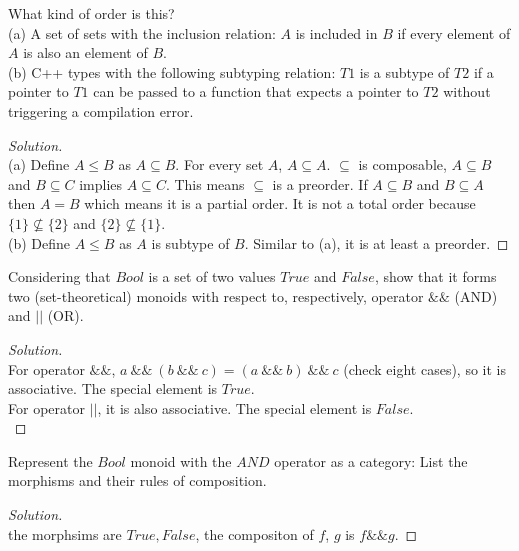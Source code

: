 \documentclass[7x10,thmnumcontwithchapter,WebLink,AddlevelTwoTOC,NumRef,BookEndNote,printer]{pupbook}
\begin{document}
\begin{exercise}
What kind of order is this? \\
(a) A set of sets with the inclusion relation: $A$ is included in $B$ if every element of $A$ is also an element of $B$.\\
(b) C++ types with the following subtyping relation: $T1$ is a subtype of $T2$ if a pointer to $T1$ can be passed to a function that expects a pointer to $T2$ without triggering a compilation error.
\end{exercise}

\begin{proof}[Solution]
~\\
(a) Define $A \leq B$ as $A \subseteq B$. For every set $A$, $A \subseteq A$. $\subseteq$ is composable, $A \subseteq B$ and $B \subseteq C$ implies $A \subseteq C$. This means $\subseteq$ is a preorder. If $A \subseteq B $ and $B \subseteq A$ then $A = B$ which means it is a partial order. It is not a total order because $\{1\} \nsubseteq  \{2\}$ and $\{2\} \nsubseteq \{1\}$. \\
(b) Define $A \leq B$ as $A$ is  subtype  of  $B$. 	Similar to (a), it is at least a preorder.
\end{proof}


\begin{exercise}
Considering that $Bool$ is a set of two values $True$ and $False$, show
that it forms two (set-theoretical) monoids with respect to, respectively,
operator $\&\&$ (AND) and $||$ (OR).
\end{exercise}

\begin{proof}[Solution]
~\\
For operator $\&\&$,  $a \ \&\& \ (b \ \&\& \ c) = (a\ \&\& \ b) \ \&\& \ c$ (check eight cases),  so it is associative. The special element is
$True$. \\
For operator $||$, it is also associative. The special element is $False$. \\
\end{proof}



\begin{exercise}
Represent the $Bool$ monoid with the $AND$ operator as a category:
List the morphisms and their rules of composition.
\end{exercise}

\begin{proof}[Solution]
~\\
the morphsims are $True, False$,  the compositon of $f$, $g$ is $f \&\& g$.
\end{proof}
\end{document}

